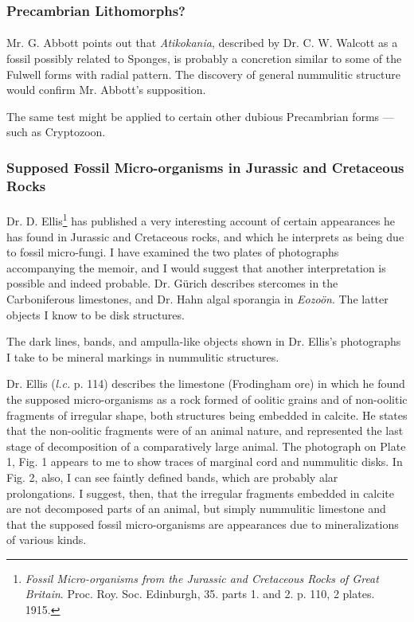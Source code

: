 \documentclass[a4paper, 12pt, oneside]{article}
\begin{document}
\subsubsection{Precambrian Lithomorphs?}
\paragraph{}
Mr. G. Abbott points out that \emph{Atikokania}, described by Dr. C. W. Walcott as a fossil possibly related to Sponges, is probably a concretion similar to some of the Fulwell forms with radial pattern. The discovery of general nummulitic structure would confirm Mr. Abbott's supposition.

The same test might be applied to certain other dubious Precambrian forms --- such as Cryptozoon.

\subsubsection{Supposed Fossil Micro-organisms in Jurassic and Cretaceous Rocks}
\paragraph{}
Dr. D. Ellis\footnote{\emph{Fossil Micro-organisms from the Jurassic and Cretaceous Rocks of Great Britain}. Proc. Roy. Soc. Edinburgh, 35. parts 1. and 2. p. 110, 2 plates. 1915.} has published a very interesting account of certain appearances he has found in Jurassic and Cretaceous rocks, and which he interprets as being due to fossil micro-fungi. I have examined the two plates of photographs accompanying the memoir, and I would suggest that another interpretation is possible and indeed probable. Dr. Gürich describes stercomes in the Carboniferous limestones, and Dr. Hahn algal sporangia in \emph{Eozoön}. The latter objects I know to be disk structures.

The dark lines, bands, and ampulla-like objects shown in Dr. Ellis's photographs I take to be mineral markings in nummulitic structures.

Dr. Ellis (\emph{l.c.} p. 114) describes the limestone (Frodingham ore) in which he found the supposed micro-organisms as a rock formed of oolitic grains and of non-oolitic fragments of irregular shape, both structures being embedded in calcite. He states that the non-oolitic fragments were of an animal nature, and represented the last stage of decomposition of a comparatively large animal. The photograph on Plate 1, Fig. 1 appears to me to show traces of marginal cord and nummulitic disks. In Fig. 2, also, I can see faintly defined bands, which are probably alar prolongations. I suggest, then, that the irregular fragments embedded in calcite are not decomposed parts of an animal, but simply nummulitic limestone and that the supposed fossil micro-organisms are appearances due to mineralizations of various kinds.
\end{document}
